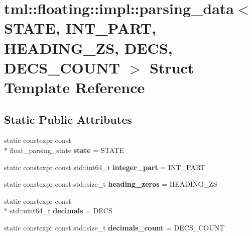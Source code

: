 \hypertarget{structtml_1_1floating_1_1impl_1_1parsing__data}{\section{tml\+:\+:floating\+:\+:impl\+:\+:parsing\+\_\+data$<$ S\+T\+A\+T\+E, I\+N\+T\+\_\+\+P\+A\+R\+T, H\+E\+A\+D\+I\+N\+G\+\_\+\+Z\+S, D\+E\+C\+S, D\+E\+C\+S\+\_\+\+C\+O\+U\+N\+T $>$ Struct Template Reference}
\label{structtml_1_1floating_1_1impl_1_1parsing__data}
}
\subsection*{Static Public Attributes}
\begin{DoxyCompactItemize}
\item 
\hypertarget{structtml_1_1floating_1_1impl_1_1parsing__data_af228f50016a6d00dd2acb4e27a0d3c16}{static constexpr const \\*
float\+\_\+parsing\+\_\+state {\bfseries state} = S\+T\+A\+T\+E}\label{structtml_1_1floating_1_1impl_1_1parsing__data_af228f50016a6d00dd2acb4e27a0d3c16}

\item 
\hypertarget{structtml_1_1floating_1_1impl_1_1parsing__data_ac50563638533c911c27b234af2cc0484}{static constexpr const std\+::int64\+\_\+t {\bfseries integer\+\_\+part} = I\+N\+T\+\_\+\+P\+A\+R\+T}\label{structtml_1_1floating_1_1impl_1_1parsing__data_ac50563638533c911c27b234af2cc0484}

\item 
\hypertarget{structtml_1_1floating_1_1impl_1_1parsing__data_a8f3236517d46c72c13f1ad1893375958}{static constexpr const std\+::size\+\_\+t {\bfseries heading\+\_\+zeros} = H\+E\+A\+D\+I\+N\+G\+\_\+\+Z\+S}\label{structtml_1_1floating_1_1impl_1_1parsing__data_a8f3236517d46c72c13f1ad1893375958}

\item 
\hypertarget{structtml_1_1floating_1_1impl_1_1parsing__data_a36dad24e3be4da8817eb9f158915060c}{static constexpr const \\*
std\+::uint64\+\_\+t {\bfseries decimals} = D\+E\+C\+S}\label{structtml_1_1floating_1_1impl_1_1parsing__data_a36dad24e3be4da8817eb9f158915060c}

\item 
\hypertarget{structtml_1_1floating_1_1impl_1_1parsing__data_a4b45d794106cf67355327b9b769aeccc}{static constexpr const std\+::size\+\_\+t {\bfseries decimals\+\_\+count} = D\+E\+C\+S\+\_\+\+C\+O\+U\+N\+T}\label{structtml_1_1floating_1_1impl_1_1parsing__data_a4b45d794106cf67355327b9b769aeccc}

\end{DoxyCompactItemize}


